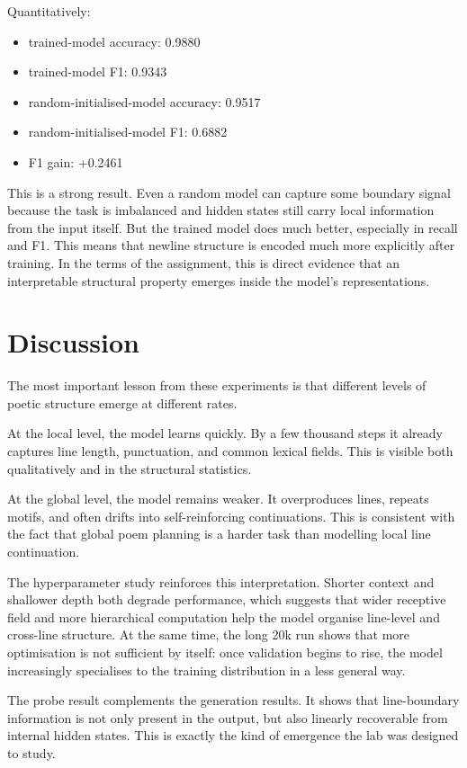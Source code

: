 \documentclass[11pt]{article}
\begin{document}
Quantitatively:
\begin{itemize}
    \item trained-model accuracy: 0.9880
    \item trained-model F1: 0.9343
    \item random-initialised-model accuracy: 0.9517
    \item random-initialised-model F1: 0.6882
    \item F1 gain: +0.2461
\end{itemize}

This is a strong result. Even a random model can capture some boundary signal because the task is imbalanced and hidden states still carry local information from the input itself. But the trained model does much better, especially in recall and F1. This means that newline structure is encoded much more explicitly after training. In the terms of the assignment, this is direct evidence that an interpretable structural property emerges inside the model's representations.

\section{Discussion}
The most important lesson from these experiments is that different levels of poetic structure emerge at different rates.

At the local level, the model learns quickly. By a few thousand steps it already captures line length, punctuation, and common lexical fields. This is visible both qualitatively and in the structural statistics.

At the global level, the model remains weaker. It overproduces lines, repeats motifs, and often drifts into self-reinforcing continuations. This is consistent with the fact that global poem planning is a harder task than modelling local line continuation.

The hyperparameter study reinforces this interpretation. Shorter context and shallower depth both degrade performance, which suggests that wider receptive field and more hierarchical computation help the model organise line-level and cross-line structure. At the same time, the long 20k run shows that more optimisation is not sufficient by itself: once validation begins to rise, the model increasingly specialises to the training distribution in a less general way.

The probe result complements the generation results. It shows that line-boundary information is not only present in the output, but also linearly recoverable from internal hidden states. This is exactly the kind of emergence the lab was designed to study.
\end{document}
